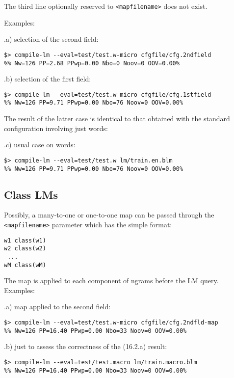 \noindent The third line optionally reserved to {\tt <mapfilename>} does not exist.

\bigskip
\noindent
Examples:

\bigskip
\noindent
\thesubsection.a) selection of the second field:
\begin{verbatim}
$> compile-lm --eval=test/test.w-micro cfgfile/cfg.2ndfield
%% Nw=126 PP=2.68 PPwp=0.00 Nbo=0 Noov=0 OOV=0.00%
\end{verbatim}

\noindent
\thesubsection.b) selection of the first field:
\begin{verbatim}
$> compile-lm --eval=test/test.w-micro cfgfile/cfg.1stfield
%% Nw=126 PP=9.71 PPwp=0.00 Nbo=76 Noov=0 OOV=0.00%
\end{verbatim}

\noindent The result of the latter case is identical to that obtained with
the standard configuration involving just words:

\bigskip
\noindent
\thesubsection.c) usual case on words:
\begin{verbatim}
$> compile-lm --eval=test/test.w lm/train.en.blm 
%% Nw=126 PP=9.71 PPwp=0.00 Nbo=76 Noov=0 OOV=0.00%
\end{verbatim}


\subsection{Class LMs}

Possibly, a many-to-one or one-to-one map can be passed through the
{\tt <mapfilename>} parameter which has the simple format:

\begin{verbatim}
w1 class(w1)
w2 class(w2)
 ...
wM class(wM)
\end{verbatim}


\noindent The map is applied to each component of ngrams before the LM
query. Examples:
\bigskip

\noindent \thesubsection.a) map applied to the second field:
\begin{verbatim}
$> compile-lm --eval=test/test.w-micro cfgfile/cfg.2ndfld-map
%% Nw=126 PP=16.40 PPwp=0.00 Nbo=33 Noov=0 OOV=0.00%
\end{verbatim}



\noindent \thesubsection.b) just to assess the correctness of the (16.2.a) result:
\begin{verbatim}
$> compile-lm --eval=test/test.macro lm/train.macro.blm
%% Nw=126 PP=16.40 PPwp=0.00 Nbo=33 Noov=0 OOV=0.00%


\end{verbatim}



